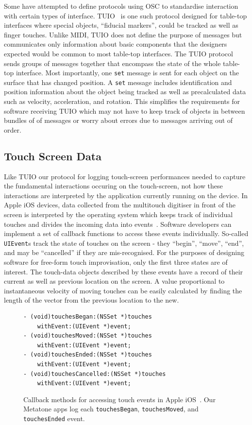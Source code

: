 \documentclass[graybox]{svmult}
\begin{document}
Some have attempted to define protocols using OSC to standardise
interaction with certain types of interface. TUIO~\cite{TUIO_KBBC05}
is one such protocol designed for table-top interfaces where special
objects, ``fiducial markers'', could be tracked as well as finger
touches. Unlike MIDI, TUIO does not define the purpose of messages but
communicates only information about basic components that the
designers expected would be common to most table-top interfaces. The
TUIO protocol sends groups of messages together that encompass the
state of the whole table-top interface. Most importantly, one
\texttt{set} message is sent for each object on the surface that has
changed position. A \texttt{set} message includes
identification and position information about the object being tracked
as well as precalculated data such as velocity, acceleration, and
rotation. This simplifies the requirements for software receiving TUIO
which may not have to keep track of objects in between bundles of of
messages or worry about errors due to messages arriving out of order.

\subsection{Touch Screen Data}
\label{subsec:touch-screen-data}

Like TUIO our protocol for logging touch-screen performances needed to
capture the fundamental interactions occuring on the touch-screen, not
how these interactions are interpreted by the application currently
running on the device. In Apple iOS devices, data collected from the
multitouch digitiser in front of the screen is interpreted by the
operating system which keeps track of individual touches and divides
the incoming data into events~\cite{AppleDeveloper:2015rm}. Software
developers can implement a set of callback functions to access these
events individually. So-called \texttt{UIEvent}s track the state of
touches on the screen - they ``begin'', ``move'', ``end'', and may be
``cancelled'' if they are mis-recognised. For the purposes of
designing software for free-form touch improvisation, only the first
three states are of interest. The touch-data objects described by
these events have a record of their current as well as previous
location on the screen. A value proportional to instantaneous velocity
of moving touches can be easily calculated by finding the length of
the vector from the previous location to the new.

\begin{figure}
\begin{verbatim}
- (void)touchesBegan:(NSSet *)touches 
    withEvent:(UIEvent *)event;
- (void)touchesMoved:(NSSet *)touches 
    withEvent:(UIEvent *)event;
- (void)touchesEnded:(NSSet *)touches 
    withEvent:(UIEvent *)event;
- (void)touchesCancelled:(NSSet *)touches 
    withEvent:(UIEvent *)event;
\end{verbatim}
\caption{Callback methods for accessing touch events in
  Apple iOS~\cite{AppleDeveloper:2015rm}. Our Metatone apps log each
  \texttt{touchesBegan}, \texttt{touchesMoved}, and \texttt{touchesEnded} event.}
\label{touch-event-code-listing}
\end{figure}
\end{document}

